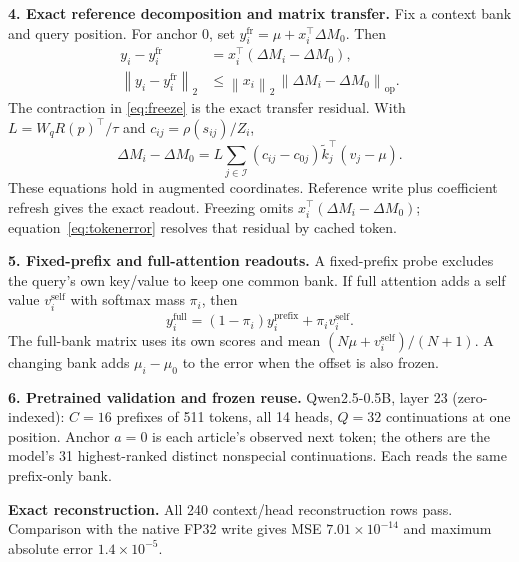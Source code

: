 \documentclass[10pt,a4paper]{article}
\newcommand{\T}{^{\!\top}}
\newcommand{\calI}{\mathcal I}
\newcommand{\ddM}{\Delta M}
\newcommand{\norm}[1]{\left\lVert#1\right\rVert}
\begin{document}
\textbf{4. Exact reference decomposition and matrix transfer.}
Fix a context bank and query position. For anchor $0$, set
$y_i^{\mathrm{fr}}=\mu+x_i\T\ddM_0$. Then
\begin{equation}
\boxed{\begin{aligned}
y_i-y_i^{\mathrm{fr}}&=x_i\T(\ddM_i-\ddM_0),\\
\norm{y_i-y_i^{\mathrm{fr}}}_2&\leq\norm{x_i}_2\,\norm{\ddM_i-\ddM_0}_{\mathrm{op}}.
\end{aligned}}
\label{eq:freeze}
\end{equation}
The contraction in \eqref{eq:freeze} is the exact transfer residual.
With $L=W_qR(p)\T/\tau$ and $c_{ij}=\rho(s_{ij})/Z_i$,
\begin{equation}
\ddM_i-\ddM_0=L\sum_{j\in\calI}(c_{ij}-c_{0j})\widetilde k_j\T(v_j-\mu).
\label{eq:refresh}
\end{equation}
These equations hold in augmented coordinates. Reference write plus coefficient
refresh gives the exact readout. Freezing omits $x_i\T(\ddM_i-\ddM_0)$;
equation~\eqref{eq:tokenerror} resolves that residual by cached token.

\textbf{5. Fixed-prefix and full-attention readouts.}
A fixed-prefix probe excludes the query's own key/value to keep one common bank.
If full attention adds a self value $v_i^{\mathrm{self}}$ with softmax mass $\pi_i$, then
\begin{equation}
y_i^{\mathrm{full}}=(1-\pi_i)y_i^{\mathrm{prefix}}+\pi_i v_i^{\mathrm{self}}.
\label{eq:full}
\end{equation}
The full-bank matrix uses its own scores and mean
$(N\mu+v_i^{\mathrm{self}})/(N+1)$. A changing bank adds $\mu_i-\mu_0$ to the
error when the offset is also frozen.

\textbf{6. Pretrained validation and frozen reuse.}
Qwen2.5-0.5B, layer 23 (zero-indexed): $C=16$ prefixes of 511 tokens,
all 14 heads, $Q=32$ continuations at one position. Anchor $a=0$ is each article's
observed next token; the others are the model's 31 highest-ranked distinct nonspecial
continuations. Each reads the same prefix-only bank.

\textbf{Exact reconstruction.}
All 240 context/head reconstruction rows pass. Comparison with the native FP32
write gives MSE $7.01\times10^{-14}$ and maximum absolute error $1.4\times10^{-5}$.
\end{document}
